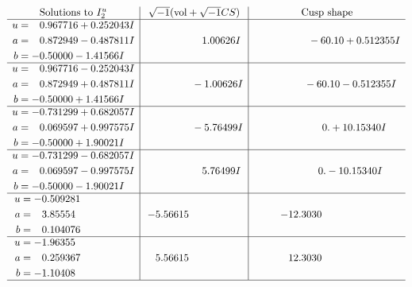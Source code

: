 \documentclass[1p]{elsarticle_modified}
\theoremstyle{definition}
\newcommand{\I}{\sqrt{-1}}
\begin{document}
$$\begin{array}{c|c|c}  
\text{Solutions to }I^u_{2}& \I (\text{vol} + \sqrt{-1}CS) & \text{Cusp shape}\\
 \hline 
\begin{aligned}
u &= \phantom{-}0.967716 + 0.252043 I \\
a &= \phantom{-}0.872949 - 0.487811 I \\
b &= -0.50000 - 1.41566 I\end{aligned}
 & \phantom{-0.000000 -}1.00626 I & \phantom{-0.000000 -}     -6
0. 10   + 0.512355 I \\ \hline\begin{aligned}
u &= \phantom{-}0.967716 - 0.252043 I \\
a &= \phantom{-}0.872949 + 0.487811 I \\
b &= -0.50000 + 1.41566 I\end{aligned}
 & \phantom{-0.000000 } -1.00626 I & \phantom{-0.000000 }      -6
0. 10   - 0.512355 I \\ \hline\begin{aligned}
u &= -0.731299 + 0.682057 I \\
a &= \phantom{-}0.069597 + 0.997575 I \\
b &= -0.50000 + 1.90021 I\end{aligned}
 & \phantom{-0.000000 } -5.76499 I & \phantom{-0.000000 -}0. + 10.15340 I \\ \hline\begin{aligned}
u &= -0.731299 - 0.682057 I \\
a &= \phantom{-}0.069597 - 0.997575 I \\
b &= -0.50000 - 1.90021 I\end{aligned}
 & \phantom{-0.000000 -}5.76499 I & \phantom{-0.000000 } 0. - 10.15340 I \\ \hline\begin{aligned}
u &= -0.509281\phantom{ +0.000000I} \\
a &= \phantom{-}3.85554\phantom{ +0.000000I} \\
b &= \phantom{-}0.104076\phantom{ +0.000000I}\end{aligned}
 & -5.56615\phantom{ +0.000000I} & -12.3030\phantom{ +0.000000I} \\ \hline\begin{aligned}
u &= -1.96355\phantom{ +0.000000I} \\
a &= \phantom{-}0.259367\phantom{ +0.000000I} \\
b &= -1.10408\phantom{ +0.000000I}\end{aligned}
 & \phantom{-}5.56615\phantom{ +0.000000I} & \phantom{-}12.3030\phantom{ +0.000000I}\\
 \hline 
 \end{array}$$\newpage
\end{document}
